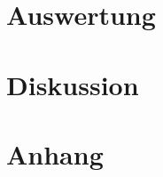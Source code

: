 \documentclass[12pt,a4paper,titlepage,headinclude,bibtotoc]{scrartcl}
\begin{document}
\section{Auswertung}
\label{sec:auswertung}

\section{Diskussion}
\label{sec:diskussion}

\section{Anhang}



\end{document}
